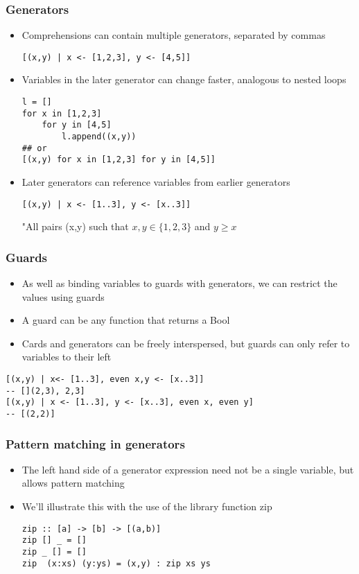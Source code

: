 \documentclass{article}[18pt]
\begin{document}
\subsubsection{Generators}
\begin{itemize}
	\item Comprehensions can contain multiple generators, separated by commas
\begin{verbatim}
[(x,y) | x <- [1,2,3], y <- [4,5]]
\end{verbatim}
	\item Variables in the later generator can change faster, analogous to nested loops
\begin{verbatim}
l = []
for x in [1,2,3]
	for y in [4,5]
		l.append((x,y))
## or
[(x,y) for x in [1,2,3] for y in [4,5]]
\end{verbatim}
	\item Later generators can reference variables from earlier generators
\begin{verbatim}
[(x,y) | x <- [1..3], y <- [x..3]]
\end{verbatim}
"All pairs (x,y) such that $x,y\in \{1,2,3\}$ and $y\geqslant x$
\end{itemize}
\subsubsection{Guards}
\begin{itemize}
	\item As well as binding variables to guards with generators, we can restrict the values using guards
	\item A guard can be any function that returns a Bool
	\item Cards and generators can be freely interspersed, but guards can only refer to variables to their left
\end{itemize}
\begin{verbatim}
[(x,y) | x<- [1..3], even x,y <- [x..3]]
-- [](2,3), 2,3]
[(x,y) | x <- [1..3], y <- [x..3], even x, even y]
-- [(2,2)]
\end{verbatim}
\subsubsection{Pattern matching in generators}
\begin{itemize}
	\item The left hand side of a generator expression need not be a single variable, but allows pattern matching
	\item We'll illustrate this with the use of the library function zip
\begin{verbatim}
zip :: [a] -> [b] -> [(a,b)]
zip [] _ = []
zip _ [] = []
zip  (x:xs) (y:ys) = (x,y) : zip xs ys
\end{verbatim}
\end{itemize}
\end{document}
